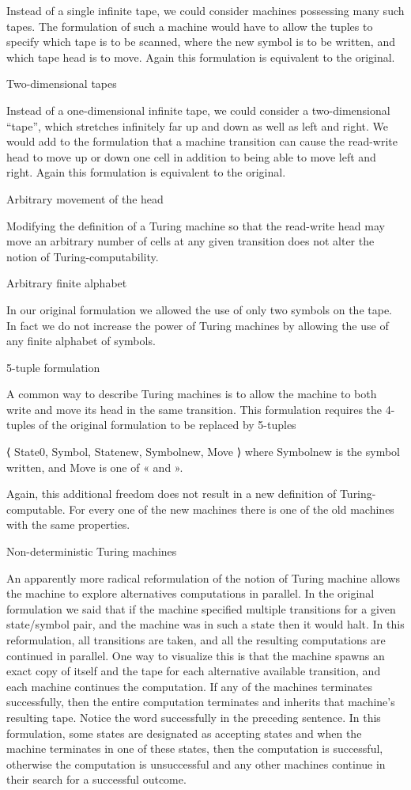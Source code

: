 Instead of a single infinite tape, we could consider machines possessing many such tapes. The formulation of such a machine would have to allow the tuples to specify which tape is to be scanned, where the new symbol is to be written, and which tape head is to move. Again this formulation is equivalent to the original.

Two-dimensional tapes

Instead of a one-dimensional infinite tape, we could consider a two-dimensional “tape”, which stretches infinitely far up and down as well as left and right. We would add to the formulation that a machine transition can cause the read-write head to move up or down one cell in addition to being able to move left and right. Again this formulation is equivalent to the original.

Arbitrary movement of the head

Modifying the definition of a Turing machine so that the read-write head may move an arbitrary number of cells at any given transition does not alter the notion of Turing-computability.

Arbitrary finite alphabet

In our original formulation we allowed the use of only two symbols on the tape. In fact we do not increase the power of Turing machines by allowing the use of any finite alphabet of symbols.

5-tuple formulation

A common way to describe Turing machines is to allow the machine to both write and move its head in the same transition. This formulation requires the 4-tuples of the original formulation to be replaced by 5-tuples

⟨ State0, Symbol, Statenew, Symbolnew, Move ⟩
where Symbolnew is the symbol written, and Move is one of « and ».

Again, this additional freedom does not result in a new definition of Turing-computable. For every one of the new machines there is one of the old machines with the same properties.

Non-deterministic Turing machines

An apparently more radical reformulation of the notion of Turing machine allows the machine to explore alternatives computations in parallel. In the original formulation we said that if the machine specified multiple transitions for a given state/symbol pair, and the machine was in such a state then it would halt. In this reformulation, all transitions are taken, and all the resulting computations are continued in parallel. One way to visualize this is that the machine spawns an exact copy of itself and the tape for each alternative available transition, and each machine continues the computation. If any of the machines terminates successfully, then the entire computation terminates and inherits that machine's resulting tape. Notice the word successfully in the preceding sentence. In this formulation, some states are designated as accepting states and when the machine terminates in one of these states, then the computation is successful, otherwise the computation is unsuccessful and any other machines continue in their search for a successful outcome.

